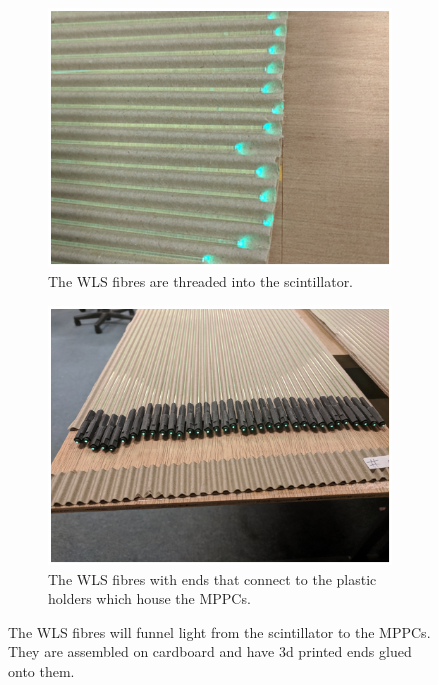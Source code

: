 \begin{figure}[htbp]
\centering
\begin{subfigure}{.5\textwidth}
  \centering
  \includegraphics[width=\linewidth]{Chapter3/Figs/Raster/detCon013b_WlsFibres.png}
  \captionsetup{width=.9\linewidth}
  \caption{The WLS fibres are threaded into the scintillator.}
  \label{subFig:detCon013b_WlsFibres}
\end{subfigure}%
\begin{subfigure}{.5\textwidth}
  \centering
  \includegraphics[width=\linewidth]{Chapter3/Figs/Raster/detCon014b_WlsWithEnds.png}
  \captionsetup{width=.9\linewidth}
  \caption{The WLS fibres with ends that connect to the plastic holders which house the MPPCs.}
  \label{subFig:detCon014b_WlsWithEnds}
\end{subfigure}
\caption{The WLS fibres will funnel light from the scintillator to the MPPCs. They are assembled on cardboard and have 3d printed ends glued onto them.}
\label{fig:detCon_WlsFibres_WlsWithEnds}
\end{figure}

